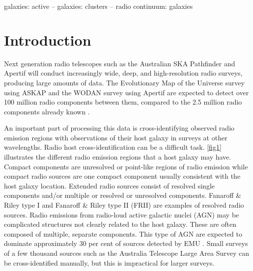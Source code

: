 \documentclass[fleqn,usenatbib,usedcolumn]{mnras}
\begin{document}
\begin{keywords}
galaxies: active -- galaxies: clusters -- radio continuum: galaxies
\end{keywords}


\section{Introduction}\label{introduction}

  Next generation radio telescopes such as the Australian SKA Pathfinder
  \citep[ASKAP;][]{johnston07} and Apertif \citep{verheijen08} will conduct
  increasingly wide, deep, and high-resolution radio surveys, producing large
  amounts of data. The Evolutionary Map of the Universe survey
  \citep[EMU;][]{norris11} using ASKAP and the WODAN survey
  \citep{rottgering11} using Apertif are expected to detect over 100 million
  radio components between them, compared to the 2.5 million radio components
  already known \citep{banfield15}.

  An important part of processing this data is cross-identifying observed
  radio emission regions with observations of their host galaxy in surveys at
  other wavelengths. Radio host cross-identification can be a difficult task.
  \autoref{fig1} illustrates the different radio emission regions that a host
  galaxy may have. Compact components are unresolved or point-like regions of
  radio emission while compact radio sources are one compact component usually
  consistent with the host galaxy location. Extended radio sources consist of
  resolved single components and/or multiple or resolved or unresolved
  components. Fanaroff \& Riley type I \citep[FRI; ][]{Fanaroff1974} and
  Fanaroff \& Riley type II (FRII) are examples of resolved radio sources.
  Radio emissions from radio-loud active galactic nuclei (AGN) may be
  complicated structures not clearly related to the host galaxy. These are
  often composed of multiple, separate components. This type of AGN are
  expected to dominate approximately 30 per cent of sources detected by EMU
  \citep{norris11}. Small surveys of a few thousand sources such as the
  Australia Telescope Large Area Survey
  \citep[ATLAS;][]{norris06,middelberg08} can be cross-identified manually,
  but this is impractical for larger surveys.
\end{document}
